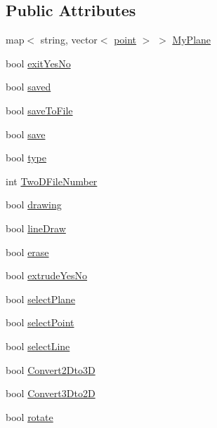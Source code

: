 \subsection*{Public Attributes}
\begin{DoxyCompactItemize}
\item 
map$<$ string, vector$<$ \hyperlink{structpoint}{point} $>$ $>$ \hyperlink{classInteractive__editor_a1e77c81fdaf1da82816d476fa431fc34}{My\+Plane}
\item 
bool \hyperlink{classInteractive__editor_a66468db06170aca0dae8e057d98253bd}{exit\+Yes\+No}
\item 
bool \hyperlink{classInteractive__editor_a2e6cd28cc09c6250bb5aa720acfc16a4}{saved}
\item 
bool \hyperlink{classInteractive__editor_a82aa208ba6d10c885699d227d928c82c}{save\+To\+File}
\item 
bool \hyperlink{classInteractive__editor_a7af788147541bfc20163c1c2a8550cbe}{save}
\item 
bool \hyperlink{classInteractive__editor_a93c2f2041e432c8047d51942345cc3f9}{type}
\item 
int \hyperlink{classInteractive__editor_a016e5e8e9a124977ab6048c90980be97}{Two\+D\+File\+Number}
\item 
bool \hyperlink{classInteractive__editor_ace62b483a0866c64212ee0c641445c7a}{drawing}
\item 
bool \hyperlink{classInteractive__editor_aa0de8abac09ce2259252fba6c1958e83}{line\+Draw}
\item 
bool \hyperlink{classInteractive__editor_ac2f2f1dfb6c21585d4ed5ed043e41b25}{erase}
\item 
bool \hyperlink{classInteractive__editor_a1688fc65949d3d4c337b7b4e36986f3c}{extrude\+Yes\+No}
\item 
bool \hyperlink{classInteractive__editor_a9da61abe038ee33f9d15ef4a028dc8ab}{select\+Plane}
\item 
bool \hyperlink{classInteractive__editor_ab0f07759c3ff1bcfe45d0c285abe29b5}{select\+Point}
\item 
bool \hyperlink{classInteractive__editor_a69d697425045525e2aadd2eb956fce24}{select\+Line}
\item 
bool \hyperlink{classInteractive__editor_a13a2206b6c7e86947e85830afb229f36}{Convert2\+Dto3D}
\item 
bool \hyperlink{classInteractive__editor_a83829cee0dd00c90dbb841abde5596a4}{Convert3\+Dto2D}
\item 
bool \hyperlink{classInteractive__editor_a9accc369abf6972993bb5c2ba047542c}{rotate}

\end{DoxyCompactItemize}

